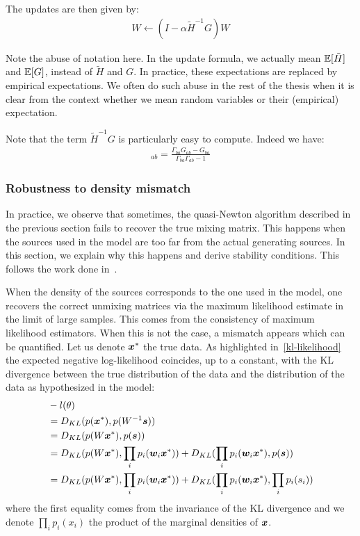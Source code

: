 The updates are then given by:
\begin{align}
  W \leftarrow (I - \alpha \tilde{H}^{-1} G) W
\end{align}

Note the abuse of notation here. In the update formula, we actually mean
$\mathbb{E}[\tilde{H}]$ and $\mathbb{E}[G]$,
instead of $\tilde{H}$ and $G$.
In practice, these expectations are replaced by empirical expectations. We often do such abuse in the rest of the thesis when it is clear from the context whether we mean random variables or their (empirical) expectation. 

Note that the term $\tilde{H}^{-1} G$ is particularly easy to compute. Indeed we
have:
\begin{align}
[\tilde{H}^{-1} G]_{ab} = \frac{\Gamma_{ba} G_{ab} - G_{ba}}{\Gamma_{ba}
  \Gamma_{ab} - 1}
\end{align}

\subsubsection{Robustness to density mismatch}
In practice, we observe that sometimes, the quasi-Newton algorithm described in
the previous section fails to recover the true mixing matrix. This happens when the
sources used in the model are too far from the actual  generating sources.
%
In this section, we explain
why this happens and derive stability conditions. This follows the work done in~\cite{cardoso1998blind}.

When the density of the sources corresponds to the one used in the model, one
recovers the correct unmixing matrices via the maximum likelihood estimate in the
limit of large samples. This comes from the consistency of maximum likelihood
estimators.
When this is not the case, a mismatch appears which can be quantified. Let us
denote $\boldsymbol{x}^*$ the true data. As highlighted in~\eqref{kl-likelihood} the expected
negative log-likelihood coincides, up to a constant, with the KL divergence between the true
distribution of the data and the distribution of the data as hypothesized in the
model:
\begin{align}
  &-l(\theta) \\
  &=  D_{KL}(p(\boldsymbol{x}^*), p(W^{-1} \boldsymbol{s})) \\
             &=  D_{KL}(p(W\boldsymbol{x}^*), p(\boldsymbol{s})) \\
             &=  D_{KL}(p(W \boldsymbol{x}^*), \prod_i p_i(\boldsymbol{w}_i\boldsymbol{x}^*)) + D_{KL}(\prod_i p_i(\boldsymbol{w}_i\boldsymbol{x}^*), p(\boldsymbol{s})) \\
             &=  D_{KL}(p(W \boldsymbol{x}^*), \prod_i p_i(\boldsymbol{w}_i\boldsymbol{x}^*)) + D_{KL}(\prod_i p_i(\boldsymbol{w}_i\boldsymbol{x}^*), \prod_i p_i(s_i)) \\
\end{align}
where the first equality comes from the invariance of the KL divergence and we
denote $\prod_i p_i(x_i)$ the product of the marginal densities of $\boldsymbol{x}$.

